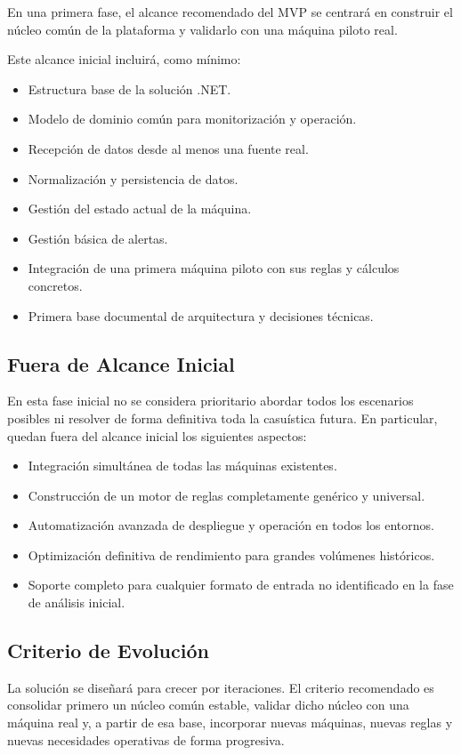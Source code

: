 En una primera fase, el alcance recomendado del MVP se centrará en construir el núcleo común de la plataforma y validarlo con una máquina piloto real.

Este alcance inicial incluirá, como mínimo:

\begin{itemize}
    \item Estructura base de la solución .NET.
    \item Modelo de dominio común para monitorización y operación.
    \item Recepción de datos desde al menos una fuente real.
    \item Normalización y persistencia de datos.
    \item Gestión del estado actual de la máquina.
    \item Gestión básica de alertas.
    \item Integración de una primera máquina piloto con sus reglas y cálculos concretos.
    \item Primera base documental de arquitectura y decisiones técnicas.
\end{itemize}

\subsection{Fuera de Alcance Inicial}

En esta fase inicial no se considera prioritario abordar todos los escenarios posibles ni resolver de forma definitiva toda la casuística futura. En particular, quedan fuera del alcance inicial los siguientes aspectos:

\begin{itemize}
    \item Integración simultánea de todas las máquinas existentes.
    \item Construcción de un motor de reglas completamente genérico y universal.
    \item Automatización avanzada de despliegue y operación en todos los entornos.
    \item Optimización definitiva de rendimiento para grandes volúmenes históricos.
    \item Soporte completo para cualquier formato de entrada no identificado en la fase de análisis inicial.
\end{itemize}

\subsection{Criterio de Evolución}

La solución se diseñará para crecer por iteraciones. El criterio recomendado es consolidar primero un núcleo común estable, validar dicho núcleo con una máquina real y, a partir de esa base, incorporar nuevas máquinas, nuevas reglas y nuevas necesidades operativas de forma progresiva.